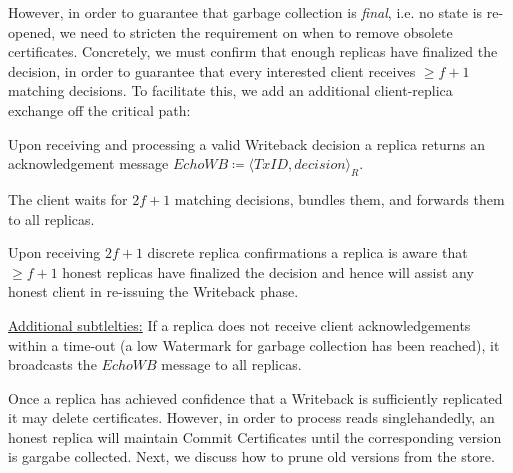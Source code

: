 However, in order to guarantee that garbage collection is \textit{final}, i.e. no state is re-opened, we need to stricten the requirement on when to remove obsolete certificates. Concretely, we must confirm that enough replicas have finalized the decision, in order to guarantee that every interested client receives $\geq f+1$ matching decisions.  To facilitate this, we add an additional client-replica exchange off the critical path:

Upon receiving and processing a valid Writeback decision a replica returns an acknowledgement message $EchoWB \coloneqq \langle TxID, decision \rangle_R$.

The client waits for $2f+1$ matching decisions, bundles them, and forwards them to all replicas.

Upon receiving $2f+1$ discrete replica confirmations a replica is aware that $\geq f+1$ honest replicas have finalized the decision and hence will assist any honest client in re-issuing the Writeback phase.

\underline{Additional subtlelties:} If a replica does not receive client acknowledgements within a time-out (a low Watermark for garbage collection has been reached), it broadcasts the $EchoWB$ message to all replicas. 

Once a replica has achieved confidence that a Writeback is sufficiently replicated it may delete certificates. However, in order to process reads singlehandedly, an honest replica will maintain Commit Certificates until the corresponding version is gargabe collected. Next, we discuss how to prune old versions from the store.



